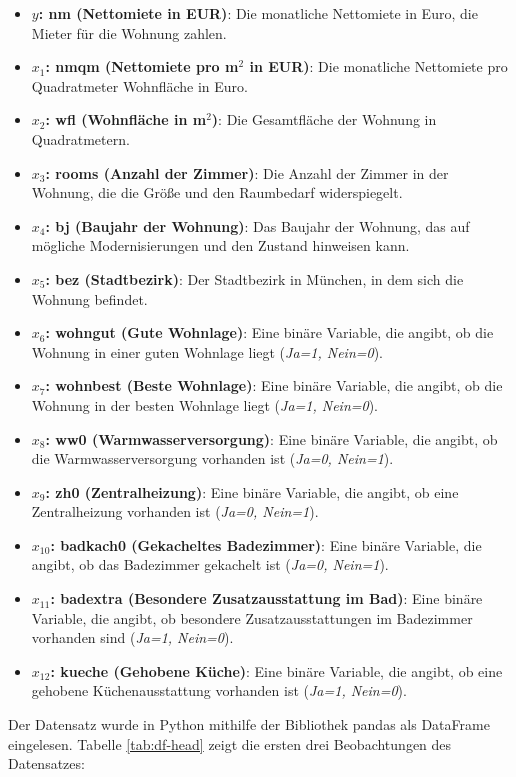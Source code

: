 \begin{itemize}
    \item \textbf{$y$: nm (Nettomiete in EUR)}: Die monatliche Nettomiete in Euro, die Mieter für die Wohnung zahlen.
    \item \textbf{$x_1$: nmqm (Nettomiete pro m$^2$ in EUR)}: Die monatliche Nettomiete pro Quadratmeter Wohnfläche in Euro.
    \item \textbf{$x_2$: wfl (Wohnfläche in m$^2$)}: Die Gesamtfläche der Wohnung in Quadratmetern.
    \item \textbf{$x_3$: rooms (Anzahl der Zimmer)}: Die Anzahl der Zimmer in der Wohnung, die die Größe und den Raumbedarf widerspiegelt.
    \item \textbf{$x_4$: bj (Baujahr der Wohnung)}: Das Baujahr der Wohnung, das auf mögliche Modernisierungen und den Zustand hinweisen kann.
    \item \textbf{$x_5$: bez (Stadtbezirk)}: Der Stadtbezirk in München, in dem sich die Wohnung befindet.
    \item \textbf{$x_6$: wohngut (Gute Wohnlage)}: Eine binäre Variable, die angibt, ob die Wohnung in einer guten Wohnlage liegt (\textit{Ja=1, Nein=0}).
    \item \textbf{$x_7$: wohnbest (Beste Wohnlage)}: Eine binäre Variable, die angibt, ob die Wohnung in der besten Wohnlage liegt (\textit{Ja=1, Nein=0}).
    \item \textbf{$x_8$: ww0 (Warmwasserversorgung)}: Eine binäre Variable, die angibt, ob die Warmwasserversorgung vorhanden ist (\textit{Ja=0, Nein=1}).
    \item \textbf{$x_9$: zh0 (Zentralheizung)}: Eine binäre Variable, die angibt, ob eine Zentralheizung vorhanden ist (\textit{Ja=0, Nein=1}).
    \item \textbf{$x_{10}$: badkach0 (Gekacheltes Badezimmer)}: Eine binäre Variable, die angibt, ob das Badezimmer gekachelt ist (\textit{Ja=0, Nein=1}).
    \item \textbf{$x_{11}$: badextra (Besondere Zusatzausstattung im Bad)}: Eine binäre Variable, die angibt, ob besondere Zusatzausstattungen im Badezimmer vorhanden sind (\textit{Ja=1, Nein=0}).
    \item \textbf{$x_{12}$: kueche (Gehobene Küche)}: Eine binäre Variable, die angibt, ob eine gehobene Küchenausstattung vorhanden ist (\textit{Ja=1, Nein=0}).
\end{itemize}

Der Datensatz wurde in Python mithilfe der Bibliothek \textsf{pandas} als DataFrame eingelesen.
Tabelle \ref{tab:df-head} zeigt die ersten drei Beobachtungen des Datensatzes:

